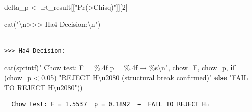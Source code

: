 \documentclass[
  letterpaper,
  DIV=11,
  numbers=noendperiod]{scrartcl}
\newenvironment{Shaded}{\begin{snugshade}}{\end{snugshade}}
\newcommand{\ControlFlowTok}[1]{\textcolor[rgb]{0.00,0.23,0.31}{\textbf{#1}}}
\newcommand{\DecValTok}[1]{\textcolor[rgb]{0.68,0.00,0.00}{#1}}
\newcommand{\FloatTok}[1]{\textcolor[rgb]{0.68,0.00,0.00}{#1}}
\newcommand{\FunctionTok}[1]{\textcolor[rgb]{0.28,0.35,0.67}{#1}}
\newcommand{\NormalTok}[1]{\textcolor[rgb]{0.00,0.23,0.31}{#1}}
\newcommand{\OtherTok}[1]{\textcolor[rgb]{0.00,0.23,0.31}{#1}}
\newcommand{\SpecialCharTok}[1]{\textcolor[rgb]{0.37,0.37,0.37}{#1}}
\newcommand{\StringTok}[1]{\textcolor[rgb]{0.13,0.47,0.30}{#1}}
\begin{document}
\begin{Shaded}
\begin{Highlighting}[]
\NormalTok{delta\_p    }\OtherTok{\textless{}{-}}\NormalTok{ lrt\_result[[}\StringTok{"Pr(\textgreater{}Chisq)"}\NormalTok{]][}\DecValTok{2}\NormalTok{]}

\FunctionTok{cat}\NormalTok{(}\StringTok{"}\SpecialCharTok{\textbackslash{}n}\StringTok{\textgreater{}\textgreater{}\textgreater{} Ha4 Decision:}\SpecialCharTok{\textbackslash{}n}\StringTok{"}\NormalTok{)}
\end{Highlighting}
\end{Shaded}

\begin{verbatim}

>>> Ha4 Decision:
\end{verbatim}

\begin{Shaded}
\begin{Highlighting}[]
\FunctionTok{cat}\NormalTok{(}\FunctionTok{sprintf}\NormalTok{(}\StringTok{"  Chow test: F = \%.4f  p = \%.4f  →  \%s}\SpecialCharTok{\textbackslash{}n}\StringTok{"}\NormalTok{,}
\NormalTok{            chow\_F, chow\_p,}
            \ControlFlowTok{if}\NormalTok{ (chow\_p }\SpecialCharTok{\textless{}} \FloatTok{0.05}\NormalTok{) }\StringTok{"REJECT H\textbackslash{}u2080 (structural break confirmed)"}
            \ControlFlowTok{else} \StringTok{"FAIL TO REJECT H\textbackslash{}u2080"}\NormalTok{))}
\end{Highlighting}
\end{Shaded}

\begin{verbatim}
  Chow test: F = 1.5537  p = 0.1892  →  FAIL TO REJECT H₀
\end{verbatim}
\end{document}
